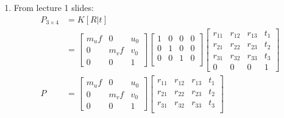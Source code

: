 \documentclass[11pt,a4paper]{article}
\begin{document}
\begin{enumerate}
    \item From lecture 1 slides:
          \begin{align*}
              P_{3 \times 4} & = K[R | t]                                                   \\
                             & = \begin{bmatrix}
                                     m_u f & 0     & u_0 \\
                                     0     & m_v f & v_0 \\
                                     0     & 0     & 1
                                 \end{bmatrix} \begin{bmatrix}
                                                   1 & 0 & 0 & 0 \\
                                                   0 & 1 & 0 & 0 \\
                                                   0 & 0 & 1 & 0 \\
                                               \end{bmatrix} \begin{bmatrix}
                                                                 r_{11} & r_{12} & r_{13} & t_1 \\
                                                                 r_{21} & r_{22} & r_{23} & t_2 \\
                                                                 r_{31} & r_{32} & r_{33} & t_3 \\
                                                                 0      & 0      & 0      & 1
                                                             \end{bmatrix} \\
              P              & = \begin{bmatrix}
                                     m_u f & 0     & u_0 \\
                                     0     & m_v f & v_0 \\
                                     0     & 0     & 1
                                 \end{bmatrix}\begin{bmatrix}
                                                  r_{11} & r_{12} & r_{13} & t_1 \\
                                                  r_{21} & r_{22} & r_{23} & t_2 \\
                                                  r_{31} & r_{32} & r_{33} & t_3 \\
                                              \end{bmatrix}
          \end{align*}


\end{enumerate}
\end{document}
